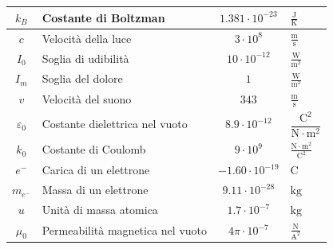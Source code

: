 \documentclass[8pt, a4paper, twocolumn, usenames, dvipsnames]{extarticle}
\begin{document}
\begin{center}
\begin{xtabular}{c M{1.8cm} c M{1.5cm}}
    \label{tab:kB} 
    $k_B$ & Costante di Boltzman & $1.381\cdot10^{-23}$ & 
    $\frac{\text{J}}{\text{K}}$\\ \midrule
    \label{tab:c} 
    $c$ & Velocità della luce & $3\cdot10^8$ & $\frac{\text{m}}{\text{s}}$\\\midrule
    \label{tab:I0} 
    $I_0$ & Soglia di udibilità & $10\cdot10^{-12}$ & 
    $\frac{\text{W}}{\text{m}^2}$\\ \midrule
    \label{tab:Im} 
    $I_m$ & Soglia del dolore & $1$ & $\frac{\text{W}}{\text{m}^2}$\\ \midrule
    \label{tab:vs} 
    $v$ & Velocità del suono & $343$ & $\frac{\text{m}}{\text{s}}$\\ \midrule
    \label{tab:e0} 
    $\varepsilon_0$& Costante dielettrica nel vuoto&$8.9\cdot10^{-12}$&
    $\dfrac{\text{C}^2}{\text{N}\cdot\text{m}^2}$\\ \midrule
    \label{tab:k0}
    $k_0$ & Costante di Coulomb & $9\cdot10^9$ & 
    $\frac{\text{N}\cdot\text{m}^2}{\text{C}^2}$\\ \midrule
    \label{tab:e-} 
    $e^{-}$ & Carica di un elettrone & $-1.60\cdot10^{-19}$ & $\text{C}$\\ \midrule
    \label{tab:me-} 
    $m_{e^{-}}$ & Massa di un elettrone & $9.11\cdot10^{-28}$ & $\text{kg}$\\\midrule
    \label{tab:u} 
    $u$ & Unità di massa atomica & $1.7\cdot10^{-7}$ & $\text{kg}$\\\midrule
    \label{tab:mu0} 
    $\mu_0$ & Permeabilità magnetica nel vuoto & $4\pi\cdot10^{-7}$ & 
    $\frac{\text{N}}{\text{A}^2}$\\
    \midrule
  \end{xtabular}
\end{center}

\newpage
\end{document}
